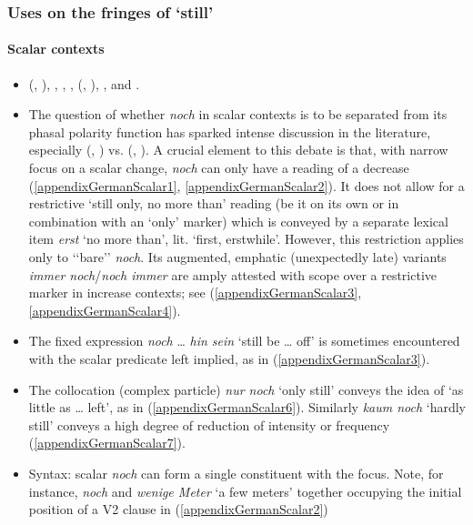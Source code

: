\subsubsection{Uses on the fringes of \lq{}still\rq{}}
\paragraph{Scalar contexts}\label{appendixGermanScalar}
\begin{itemize}
	\item {} (\citeyear{vanderAuwera1991BeyondDuality}, \citeyear{vanderAuwera1993}), \textcite{Beck2020}, \textcite[s.v. \textit{noch}]{DWDS}, \textcite[s.v. \textit{noch}]{Duden}, \textcite[176–177]{KoenigEtAl1993} \citeauthor{Loebner1989} (\citeyear{Loebner1989}, \citeyear{Loebner1999}), \textcite[620, 630]{MetrichFaucher2009},  \textcite{Shetter1966} and \textcite{Vaelikangas1982}.
	\item The question of whether \textit{noch} in scalar contexts is to be separated from its phasal polarity function has sparked intense discussion in the literature, especially \citeauthor{vanderAuwera1991BeyondDuality} (\citeyear{vanderAuwera1991BeyondDuality}, \citeyear{vanderAuwera1993}) vs. \citeauthor{Loebner1989} (\citeyear{Loebner1989}, \citeyear{Loebner1999}). A crucial element to this debate is that, with narrow focus on a scalar change, \textit{noch} can only have a reading of a decrease (\ref{appendixGermanScalar1}, \ref{appendixGermanScalar2}). It does not allow for a restrictive \lq still only, no more than' reading (be it on its own or in combination with an \lq only\rq{ }marker) which is conveyed by a separate lexical item \textit{erst} \lq no more than\rq{}, lit. \lq{}first, erstwhile'. However, this restriction applies only to \lq\lq{}bare\rq\rq{ }\textit{noch}. Its augmented, emphatic (unexpectedly late) variants \textit{immer noch}/\textit{noch immer} are amply attested with scope over a restrictive marker in increase contexts; see (\ref{appendixGermanScalar3}, \ref{appendixGermanScalar4}).
	
	\item The fixed expression \textit{noch} … \textit{hin sein} \lq still be … off\rq{ }is sometimes encountered with the scalar predicate left implied, as in (\ref{appendixGermanScalar3}).
	\item	  The collocation (complex particle) \textit{nur noch} \lq only still' conveys the idea of \lq as little as … left', as in (\ref{appendixGermanScalar6}).  Similarly \textit{kaum noch} \lq hardly still\rq{ }conveys a high degree of reduction of intensity or frequency (\ref{appendixGermanScalar7}).
	\item Syntax: scalar \textit{noch} can form a single constituent with the focus. Note, for instance, \textit{noch} and \textit{wenige Meter} \lq a few meters\rq{ }together occupying the initial position of a V2 clause in (\ref{appendixGermanScalar2})
\end{itemize}
